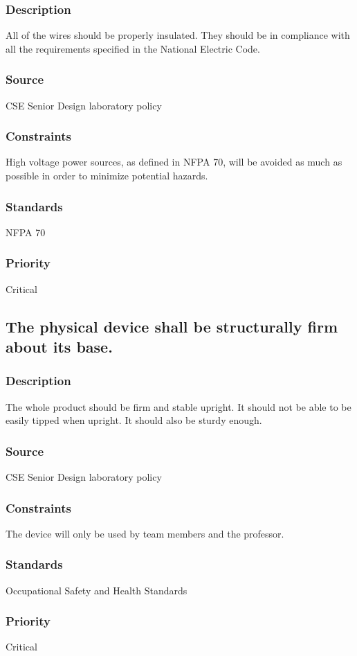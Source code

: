 \subsubsection{Description}
All of the wires should be properly insulated. They should be in compliance with all the requirements specified in the National Electric Code.
\subsubsection{Source}
CSE Senior Design laboratory policy
\subsubsection{Constraints}
High voltage power sources, as defined in NFPA 70, will be avoided as much as possible in order to minimize potential hazards.
\subsubsection{Standards}
NFPA 70
\subsubsection{Priority}
Critical

\subsection{The physical device shall be structurally firm about its base.}
\subsubsection{Description}
The whole product should be firm and stable upright. It should not be able to be easily tipped when upright. It should also be sturdy enough.
\subsubsection{Source}
CSE Senior Design laboratory policy
\subsubsection{Constraints}
The device will only be used by team members and the professor.
\subsubsection{Standards}
Occupational Safety and Health Standards
\subsubsection{Priority}
Critical
